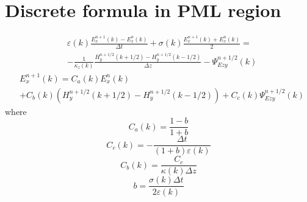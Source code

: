 \documentclass[a4paper,10pt]{article}
\begin{document}
\section{Discrete formula in PML region}
\begin{equation}
\begin{aligned}
&\varepsilon(k)\frac{E^{n+1}_{x}(k)-E^{n}_{x}(k)}{\Delta t}+\sigma(k)\frac{E^{n+1}_{x}(k)+E^{n}_{x}(k)}{2}=\\
&-\frac{1}{\kappa_z(k)}\frac{H^{n+1/2}_{y}(k+1/2)-H^{n+1/2}_{y}(k-1/2)}{\Delta z}-\Psi_{Ezy}^{n+1/2}(k)
\end{aligned}
\end{equation}
\begin{equation}
\begin{aligned}
&E^{n+1}_{x}(k)=C_{a}(k)E^{n}_{x}(k)\\
&+C_{b}(k)\left(H^{n+1/2}_{y}(k+1/2)-H^{n+1/2}_{y}(k-1/2)\right)+C_{c}(k)\Psi_{Ezy}^{n+1/2}(k)
\end{aligned}
\end{equation}
where 
\begin{equation}
C_{a}(k)=\frac{1-b}{1+b}
\end{equation}
\begin{equation}
C_{c}(k)=-\frac{\Delta t}{(1+b)\varepsilon(k)}
\end{equation}
\begin{equation}
C_{b}(k)=\frac{C_{c}}{\kappa(k)\Delta z}
\end{equation}
\begin{equation}
b=\frac{\sigma(k)\Delta t}{2\varepsilon(k)}
\end{equation}
\end{document}
